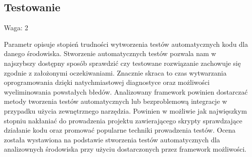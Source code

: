 \documentclass[12pt]{report}
\begin{document}
    \subsection{Testowanie}
      \begin{description}
        \item Waga: 2
      \end{description}
      Parametr opisuje stopień trudności wytworzenia testów automatycznych kodu dla danego środowiska.
      Stworzenie automatycznych testów pozwala nam w najszybszy dostępny sposób sprawdzić czy testowane rozwiązanie zachowuje się zgodnie z założonymi oczekiwaniami.
      Znacznie skraca to czas wytwarzania oprogramowania dzięki natychmiastowej diagnostyce oraz możliwości wyeliminowania powstałych błedów.
      Analizowany framework powinien dostarczać metody tworzenia testów automatycznych lub bezproblemową integracje w przypadku użycia zewnętrznego narzędzia.
      Powinien w możliwie jak najwięszkym stopniu nakłaniać do prowadzenia projektu zawierającego skrypty sprawdzające działanie kodu oraz promować popularne techniki prowadzenia testów.
      Ocena została wystawiona na podstawie stworzenia testów automatycznych dla analizownych środowiska przy użyciu dostarczonych przez framework możliwości.
\end{document}

